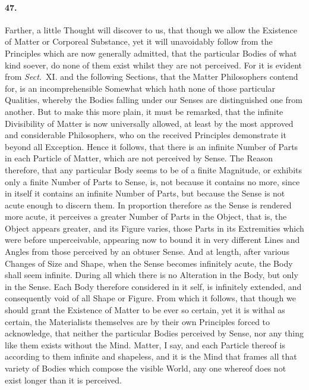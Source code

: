 \documentclass[]{article}
\newenvironment{sectionbody}{\begin{multicols}{2}}{\end{multicols}}
\begin{document}
\begin{sectionbody}
\paragraph{47.} Farther, a little Thought will discover to us, that though we
allow the Existence of Matter or Corporeal Substance, yet it will
unavoidably follow from the Principles which are now generally
admitted, that the particular Bodies of what kind soever, do none
of them exist whilst they are not perceived.  For it is evident
from \emph{Sect.}~XI.  and the following Sections, that the
Matter Philosophers contend for, is an incomprehensible Somewhat
which hath none of those particular Qualities, whereby the Bodies
falling under our Senses are distinguished one from another.  But
to make this more plain, it must be remarked, that the infinite
Divisibility of Matter is now universally allowed, at least by
the most approved and considerable Philosophers, who on the
received Principles demonstrate it beyond all Exception.  Hence
it follows, that there is an infinite Number of Parts in each
Particle of Matter, which are not perceived by Sense.  The Reason
therefore, that any particular Body seems to be of a finite
Magnitude, or exhibits only a finite Number of Parts to Sense,
is, not because it contains no more, since in itself it contains
an infinite Number of Parts, but because the Sense is not acute
enough to discern them.  In proportion therefore as the Sense is
rendered more acute, it perceives a greater Number of Parts in
the Object, that is, the Object appears greater, and its Figure
varies, those Parts in its Extremities which were before
unperceivable, appearing now to bound it in very different Lines
and Angles from those perceived by an obtuser Sense.  And at
length, after various Changes of Size and Shape, when the Sense
becomes infinitely acute, the Body shall seem infinite.  During
all which there is no Alteration in the Body, but only in the
Sense.  Each Body therefore considered in it self, is infinitely
extended, and consequently void of all Shape or Figure.  From
which it follows, that though we should grant the Existence of
Matter to be ever so certain, yet it is withal as certain, the
Materialists themselves are by their own Principles forced to
acknowledge, that neither the particular Bodies perceived by
Sense, nor any thing like them exists without the Mind.  Matter,
I say, and each Particle thereof is according to them infinite
and shapeless, and it is the Mind that frames all that variety of
Bodies which compose the visible World, any one whereof does not
exist longer than it is perceived.




\end{sectionbody}
\end{document}
